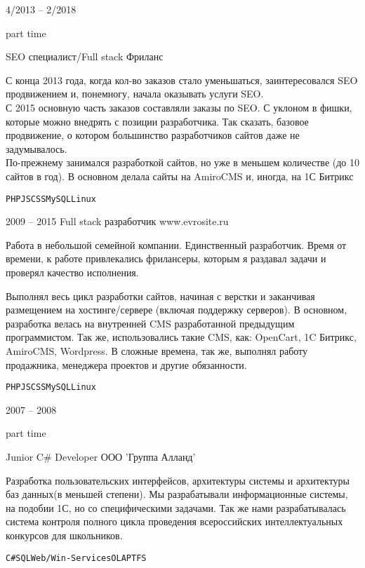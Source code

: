\documentclass[10pt]{tpl/developercv} %
\begin{document}
\begin{entrylist}
	\entry
		{4/2013 -- 2/2018

		\footnotesize{part time}}
		{SEO специалист/Full stack}
		{Фриланс}
		{С конца 2013 года, когда кол-во заказов стало уменьшаться, заинтересовался SEO продвижением и, понемногу, начала оказывать услуги SEO.\\
		С 2015 основную часть заказов составляли заказы по SEO. С уклоном в фишки, которые можно внедрять с позиции разработчика. Так сказать, базовое продвижение, о котором большинство разработчиков сайтов даже не задумывалось.\\
		По-прежнему занимался разработкой сайтов, но уже в меньшем количестве (до 10 сайтов в год). В основном делала сайты на AmiroCMS и, иногда, на 1С Битрикс

		\texttt{PHP}\slashsep\texttt{JS}\slashsep\texttt{CSS}\slashsep\texttt{MySQL}\slashsep\texttt{Linux}}

  \entry
    {2009 -- 2015}
    {Full stack разработчик}
    {www.evrosite.ru}
    {Работа в небольшой семейной компании. Единственный разработчик. Время от времени, к работе привлекались фрилансеры, которым я раздавал задачи и проверял качество исполнения.

    Выполнял весь цикл разработки сайтов, начиная с верстки и заканчивая размещением на хостинге/сервере (включая поддержку серверов). В основном, разработка велась на внутренней CMS разработанной предыдущим программистом. Так же, использовались такие CMS, как: OpenCart, 1C Битрикс, AmiroCMS, Wordpress. В сложные времена, так же, выполнял работу продажника, менеджера проектов и другие обязанности.

    \texttt{PHP}\slashsep\texttt{JS}\slashsep\texttt{CSS}\slashsep\texttt{MySQL}\slashsep\texttt{Linux}}

	\entry
		{2007 -- 2008

		\footnotesize{part time}}
		{Junior C\# Developer}
		{ООО 'Группа Алланд'}
		{Разработка пользовательских интерфейсов, архитектуры системы и архитектуры баз данных(в меньшей степени). Мы разрабатывали информационные системы, на подобии 1С, но со специфическими задачами. Так же нами разрабатывалась система контроля полного цикла проведения всероссийских интеллектуальных конкурсов для школьников.

		\texttt{C\#}\slashsep\texttt{SQL}\slashsep\texttt{Web/Win-Services}\slashsep\texttt{OLAP}\slashsep\texttt{TFS}}

\end{entrylist}

\end{document}
